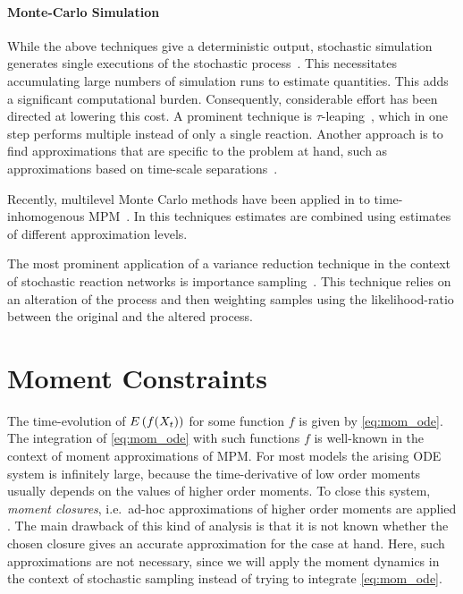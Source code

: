 \paragraph{Monte-Carlo Simulation}
While the above techniques give a deterministic output, stochastic simulation generates
single executions of the stochastic process~\cite{gillespie1977exact}.
This necessitates accumulating large numbers of simulation runs to estimate
quantities.
This adds a significant computational burden. Consequently, considerable effort
has been directed at lowering this cost.
A prominent technique is $\tau$-leaping~\cite{gillespie2001approximate},
which in one step performs multiple instead of only a single reaction.
Another approach is to find approximations that are specific to the problem at hand,
such as approximations based on time-scale separations~\cite{cao2005slow,bortolussi2015efficient}.

Recently, multilevel Monte Carlo methods have been applied in to time-inhomogenous
\ac{MPM}~\cite{anderson2018low}. In this techniques estimates are combined
using estimates of different approximation levels.


The most prominent application of a variance reduction technique in the context
of stochastic reaction networks is importance sampling~\cite{kuwahara2008efficient}.
This technique relies on an alteration of the process and then weighting samples
using the likelihood-ratio between the original and the altered process.
% 





\section{Moment Constraints}\label{sec:cv:moments}
The time-evolution of ${E}\left(f(X_t)\right)$ for some function $f$ is given by \eqref{eq:mom_ode}.
The integration of \eqref{eq:mom_ode} with such functions $f$ is well-known in the context of
moment approximations of \ac{MPM}.
For most models the arising \ac{ODE} system is infinitely large, because the time-derivative of
low order moments usually depends on the values of higher order moments.
To close this system, \emph{moment closures}, i.e.\ ad-hoc approximations of higher order moments
are applied \cite{schnoerr2015}.
The main drawback of this kind of analysis is that it is not known whether the chosen closure gives
an accurate approximation for the case at hand.
Here, such approximations are not necessary, since we will apply the moment dynamics in the context
of stochastic sampling instead of trying to integrate \eqref{eq:mom_ode}.


